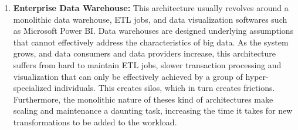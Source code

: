 \documentclass[runningheads]{llncs}
\begin{document}
\begin{enumerate}
    \item \textbf{Enterprise Data Warehouse:} This architecture usually revolves around a monolithic data warehouse, ETL jobs, and data visualization softwares such as Microsoft Power BI. Data warehouses are designed underlying assumptions that cannot effectively address the characteristics of big data. As the system grows, and data consumers and data providers increase, this architecture suffers from hard to maintain ETL jobs, slower transaction processing and visualization that can only be effectively achieved by a group of hyper-specialized individuals. This creates silos, which in turn creates frictions. Furthermore, the monolithic nature of theses kind of architectures make scaling and maintenance a daunting task, increasing the time it takes for new transformations to be added to the workload.
    
    
 
    
    

\end{enumerate}
\end{document}

